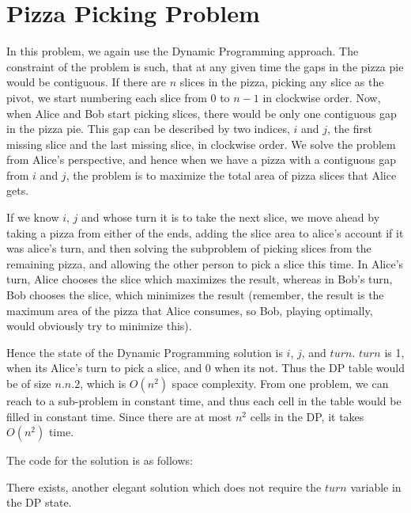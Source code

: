 \documentclass{article}
\begin{document}
\section{Pizza Picking Problem}
In this problem, we again use the Dynamic Programming approach. The constraint of the problem is such, that at any given time the gaps in the pizza pie would be contiguous. If there are $n$ slices in the pizza, picking any slice as the pivot, we start numbering each slice from $0$ to $n-1$ in clockwise order. Now, when Alice and Bob start picking slices, there would be only one contiguous gap in the pizza pie. This gap can be described by two indices, $i$ and $j$, the first missing slice and the last missing slice, in clockwise order. We solve the problem from Alice's perspective, and hence when we have a pizza with a contiguous gap from $i$ and $j$, the problem is to maximize the total area of pizza slices that Alice gets.

If we know $i$, $j$ and whose turn it is to take the next slice, we move ahead by taking a pizza from either of the ends, adding the slice area to alice's account if it was alice's turn, and then solving the subproblem of picking slices from the remaining pizza, and allowing the other person to pick a slice this time. In Alice's turn, Alice chooses the slice which maximizes the result, whereas in Bob's turn, Bob chooses the slice, which minimizes the result (remember, the result is the maximum area of the pizza that Alice consumes, so Bob, playing optimally, would obviously try to minimize this). 

Hence the state of the Dynamic Programming solution is $i$, $j$, and $turn$. $turn$ is 1, when its Alice's turn to pick a slice, and 0 when its not. Thus the DP table would be of size $n.n.2$, which is $O(n^2)$ space complexity. From one problem, we can reach to a sub-problem in constant time, and thus each cell in the table would be filled in constant time. Since there are at most $n^2$ cells in the DP, it takes $O(n^2)$ time.

The code for the solution is as follows:


There exists, another elegant solution which does not require the $turn$ variable in the DP state.
\end{document}

